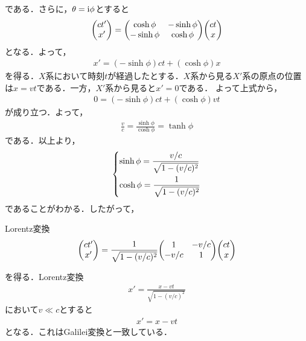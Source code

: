 \documentclass{report}
\begin{document}
    である．さらに，$\theta = \mathrm{i}\phi$とすると
    \begin{align}
      \mqty(ct' \\ x')
      =
      \mqty(
        \cosh\phi & -\sinh\phi\\
        -\sinh\phi & \cosh\phi
      )
      \mqty(ct\\ x)
    \end{align}
    となる．よって，
    \begin{align}
      x' = (-\sinh\phi)ct + (\cosh\phi)x
    \end{align}
    を得る．$X$系において時刻$t$が経過したとする．$X$系から見る$X'$系の原点の位置は$x=vt$である．一方，$X'$系から見ると$x'=0$である．
    よって上式から，
    \begin{align}
      0 = (-\sinh\phi)ct + (\cosh\phi)vt
    \end{align}
    が成り立つ．よって，
    \begin{align}
      \frac{v}{c} = \frac{\sinh\phi}{\cosh\phi} = \tanh\phi
    \end{align}
    である．以上より，
    \begin{align}
      \begin{dcases}
        \sinh\phi = \frac{v/c}{\sqrt{1- (v/c)^2}}\\
        \cosh\phi = \frac{1}{\sqrt{1- (v/c)^2}}
      \end{dcases}
    \end{align}
    であることがわかる．したがって，
    \begin{itembox}[l]{Lorentz変換}
      \begin{align}
        \mqty(ct' \\ x')
        =
        \frac{1}{\sqrt{1 - (v/c)^2}}
        \mqty(
          1 & -v/c\\
          -v/c & 1
        )
        \mqty(ct\\ x)\label{LorentzTransformation}
      \end{align}
    \end{itembox}
    を得る．Lorentz変換
    \begin{align}
      x' = \frac{x-vt}{\sqrt{1-(v/c)^2}}
    \end{align}
    において$v \ll c$とすると
    \begin{align}
      x' = x - vt
    \end{align}
    となる．これはGalilei変換と一致している．
\end{document}
